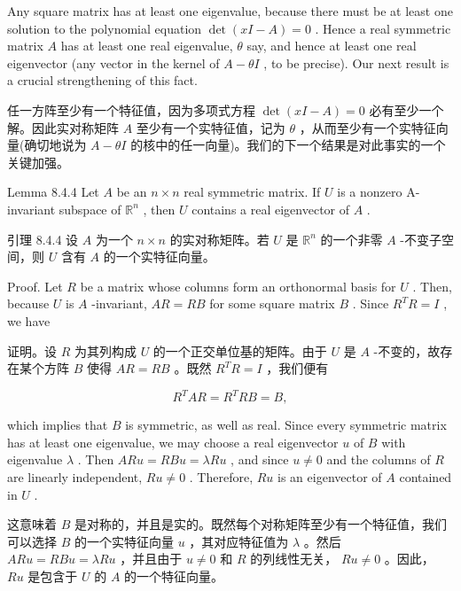 \documentclass[10pt]{article}
\begin{document}
Any square matrix has at least one eigenvalue, because there must be at least one solution to the polynomial equation \(\det \left( {{xI} - A}\right)  = 0\) . Hence a real symmetric matrix \(A\) has at least one real eigenvalue, \(\theta\) say, and hence at least one real eigenvector (any vector in the kernel of \(A - {\theta I}\) , to be precise). Our next result is a crucial strengthening of this fact.

\begin{tcolorbox}\relax
任一方阵至少有一个特征值，因为多项式方程 \(\det \left( {{xI} - A}\right)  = 0\) 必有至少一个解。因此实对称矩阵 \(A\) 至少有一个实特征值，记为 \(\theta\) ，从而至少有一个实特征向量(确切地说为 \(A - {\theta I}\) 的核中的任一向量)。我们的下一个结果是对此事实的一个关键加强。
\end{tcolorbox}

Lemma 8.4.4 Let \(A\) be an \(n \times  n\) real symmetric matrix. If \(U\) is a nonzero A-invariant subspace of \({\mathbb{R}}^{n}\) , then \(U\) contains a real eigenvector of \(A\) .

\begin{tcolorbox}\relax
引理 8.4.4 设 \(A\) 为一个 \(n \times  n\) 的实对称矩阵。若 \(U\) 是 \({\mathbb{R}}^{n}\) 的一个非零 \(A\) -不变子空间，则 \(U\) 含有 \(A\) 的一个实特征向量。
\end{tcolorbox}

Proof. Let \(R\) be a matrix whose columns form an orthonormal basis for \(U\) . Then, because \(U\) is \(A\) -invariant, \({AR} = {RB}\) for some square matrix \(B\) . Since \({R}^{T}R = I\) , we have

\begin{tcolorbox}\relax
证明。设 \(R\) 为其列构成 \(U\) 的一个正交单位基的矩阵。由于 \(U\) 是 \(A\) -不变的，故存在某个方阵 \(B\) 使得 \({AR} = {RB}\) 。既然 \({R}^{T}R = I\) ，我们便有
\end{tcolorbox}

\[
{R}^{T}{AR} = {R}^{T}{RB} = B,
\]

which implies that \(B\) is symmetric, as well as real. Since every symmetric matrix has at least one eigenvalue, we may choose a real eigenvector \(u\) of \(B\) with eigenvalue \(\lambda\) . Then \({ARu} = {RBu} = {\lambda Ru}\) , and since \(u \neq  0\) and the columns of \(R\) are linearly independent, \({Ru} \neq  0\) . Therefore, \({Ru}\) is an eigenvector of \(A\) contained in \(U\) .

\begin{tcolorbox}\relax
这意味着 \(B\) 是对称的，并且是实的。既然每个对称矩阵至少有一个特征值，我们可以选择 \(B\) 的一个实特征向量 \(u\) ，其对应特征值为 \(\lambda\) 。然后 \({ARu} = {RBu} = {\lambda Ru}\) ，并且由于 \(u \neq  0\) 和 \(R\) 的列线性无关， \({Ru} \neq  0\) 。因此， \({Ru}\) 是包含于 \(U\) 的 \(A\) 的一个特征向量。
\end{tcolorbox}
\end{document}
